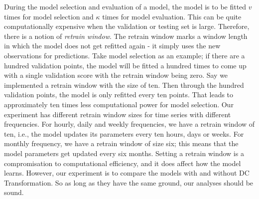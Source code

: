 During the model selection and evaluation of a model, the model is to be fitted $v$ times for model selection and $\kappa$ times for model evaluation. This can be quite computationally expensive when the validation or testing set is large. Therefore, there is a notion of \textit{retrain window}. The retrain window marks a window length in which the model does not get refitted again - it simply uses the new observations for predictions. Take model selection as an example; if there are a hundred validation points, the model will be fitted a hundred times to come up with a single validation score with the retrain window being zero. Say we implemented a retrain window with the size of ten. Then through the hundred validation points, the model is only refitted every ten points. That leads to approximately ten times less computational power for model selection. Our experiment has different retrain window sizes for time series with different frequencies. For hourly, daily and weekly frequencies, we have a retrain window of ten, i.e., the model updates its parameters every ten hours, days or weeks. For monthly frequency, we have a retrain window of size six; this means that the model parameters get updated every six months. Setting a retrain window is a compromisation to computational efficiency, and it does affect how the model learns. However, our experiment is to compare the models with and without DC Transformation. So as long as they have the same ground, our analyses should be sound.
